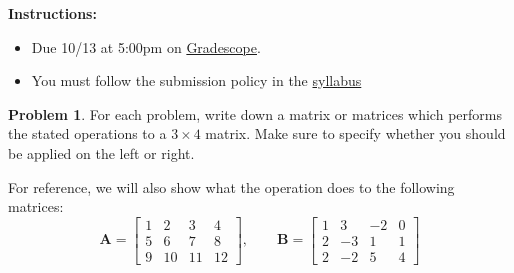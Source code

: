 \documentclass[12pt]{article}
\theoremstyle{definition}
\newtheorem{problem}{Problem}
\renewcommand{\vec}{\mathbf}
\begin{document}
\textbf{\Large{}}
    
    \vspace{-1.8em}
    \hrulefill
 
\textbf{Instructions:}
    \begin{itemize}
        \item Due 10/13 at 5:00pm on \href{https://www.gradescope.com/courses/570477/}{Gradescope}.
        \item You must follow the submission policy in the \href{https://courses.chen.pw/na_f2023/syllabus.html}{syllabus} 
\end{itemize}
   
\vspace{.5em}


\begin{problem}
    For each problem, write down a matrix or matrices which performs the stated operations to a $3\times 4$ matrix.
    Make sure to specify whether you should be applied on the left or right.

    For reference, we will also show what the operation does to the following matrices:
    \[
        \vec{A} = 
        \begin{bmatrix}
            1 & 2 & 3 & 4 \\
            5 & 6 & 7 & 8 \\
            9 & 10 & 11 & 12
        \end{bmatrix}
        ,\qquad 
        \vec{B} = 
        \begin{bmatrix}
            1 & 3& -2 & 0 \\
            2 & -3 & 1 & 1 \\
            2 & -2 & 5 & 4
        \end{bmatrix}
    \]


\end{problem}
\end{document}
